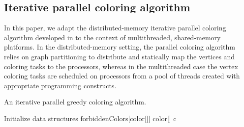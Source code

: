 \documentclass{article}
\begin{document}
\subsection{Iterative parallel coloring algorithm}
\label{sec:iterative}

In this paper, we adapt the distributed-memory iterative parallel coloring algorithm 
developed in \cite{BGMBC08} to the context of multithreaded, shared-memory platforms.
In the distributed-memory setting, the parallel coloring algorithm relies on graph partitioning 
to distribute and statically map the vertices and coloring tasks to the processors, 
whereas in the multithreaded case the vertex coloring tasks are scheduled 
on processors from a pool of threads created with appropriate programming constructs.


\begin{algorithm}[t]
\small
\caption{An iterative parallel greedy coloring algorithm.} 
\label{algorithm.iterativeparallel}
\begin{algorithmic}[1]
\State Initialize data structures 
 \State  {}
 \While{}
        \label{l:phase1} 
          \State \textsf{forbiddenColors}[\textsf{color}[]]    
        \EndFor
        \State     
        \State \textsf{color}[]   c 
     \EndFor   
    \State  {}    
      \label{l:phase2}  
           \label{l:conflict}
            \State 
          \EndIf
         \EndFor
      \EndFor
     \State 
\EndWhile
\EndProcedure
\end{algorithmic}
\end{algorithm}
\end{document}
